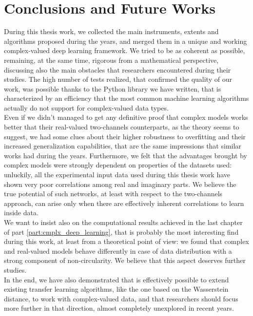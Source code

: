 \documentclass[../main.tex]{subfiles}
\begin{document}
	

\chapter*{Conclusions and Future Works}

During this thesis work, we collected the main instruments, extents and algorithms proposed during the years, and merged them in a unique and working complex-valued deep learning framework. We tried to be as coherent as possible, remaining, at the same time, rigorous from a mathematical perspective, discussing also the main obstacles that researchers encountered during their studies. The high number of tests realized, that confirmed the quality of our work, was possible thanks to the Python library we have written, that is characterized by an efficiency that the most common machine learning algorithms actually do not support for complex-valued data types.\\
Even if we didn't managed to get any definitive proof that complex models works better that their real-valued two-channels counterparts, as the theory seems to suggest, we had some clues about their higher robustness to overfitting and their increased generalization capabilities, that are the same impressions that similar works had during the years. Furthermore, we felt that the advantages brought by complex models were strongly dependent on properties of the datasets used: unluckily, all the experimental input data used during this thesis work have shown very poor correlations among real and imaginary parts. We believe the true potential of such networks, at least with respect to the two-channels approach, can arise only when there are effectively inherent correlations to learn inside data. \\
We want to insist also on the computational results achieved in the last chapter of part \ref{part:cmplx_deep_learning}, that is probably the most interesting find during this work, at least from a theoretical point of view: we found that complex and real-valued models behave differently in case of data distribution with a strong component of non-circularity. We believe that this aspect deserves further studies.\\
In the end, we have also demonstrated that is effectively possible to extend existing transfer learning algorithms, like the one based on the Wasserstein distance, to work with complex-valued data, and that researchers should focus more further in that direction, almost completely unexplored in recent years.
	
	
\end{document}
